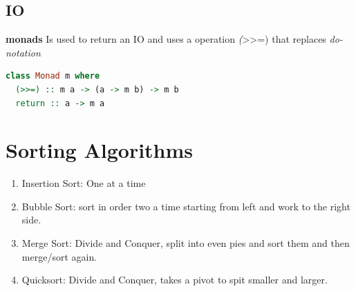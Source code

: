 \subsection{IO}
\textbf{monads}
Is used to return an IO and uses a operation \emph(>>=) that replaces \emph{do-notation}
\begin{lstlisting}[language=Haskell]
class Monad m where
  (>>=) :: m a -> (a -> m b) -> m b
  return :: a -> m a
\end{lstlisting}



\section{Sorting Algorithms}
\begin{enumerate}
\item Insertion Sort: One at a time
\item Bubble Sort: sort in order two a time starting from left and work to the right side.
\item Merge Sort: Divide and Conquer, split into even pies and sort them and then merge/sort again. 
\item Quicksort: Divide and Conquer, takes a pivot to spit smaller and larger.
\end{enumerate}

